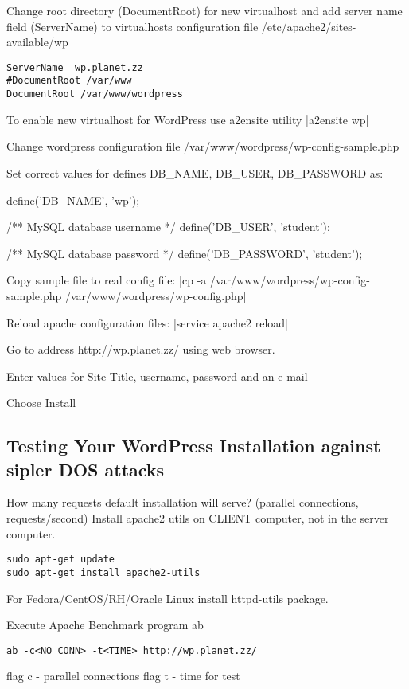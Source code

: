 Change root directory (DocumentRoot) for new virtualhost and add server name field (ServerName) to virtualhosts configuration file   /etc/apache2/sites-available/wp


\begin{verbatim}
ServerName	wp.planet.zz
#DocumentRoot /var/www
DocumentRoot /var/www/wordpress
\end{verbatim}


To enable new virtualhost for WordPress use a2ensite utility
|a2ensite wp|

Change wordpress configuration file
/var/www/wordpress/wp-config-sample.php

Set correct values for defines DB\_NAME, DB\_USER, DB\_PASSWORD as:

define('DB\_NAME', 'wp');

/** MySQL database username */
define('DB\_USER', 'student');

/** MySQL database password */
define('DB\_PASSWORD', 'student');


Copy sample file to real config file:
|cp  -a /var/www/wordpress/wp-config-sample.php /var/www/wordpress/wp-config.php|

Reload apache configuration files:
|service  apache2 reload|

Go to address http://wp.planet.zz/ using web browser.

Enter values for  Site Title, username, password and an e-mail

Choose Install

\subsection{Testing Your WordPress Installation against sipler DOS attacks}


How many requests default installation will serve? (parallel connections, requests/second)
Install apache2 utils on CLIENT computer, not in the server computer.

\begin{verbatim}
sudo apt-get update
sudo apt-get install apache2-utils
\end{verbatim}

For Fedora/CentOS/RH/Oracle Linux install httpd-utils package.

Execute Apache Benchmark program ab
\begin{verbatim}
ab -c<NO_CONN> -t<TIME> http://wp.planet.zz/
\end{verbatim}
flag c - parallel connections
flag t - time for test

